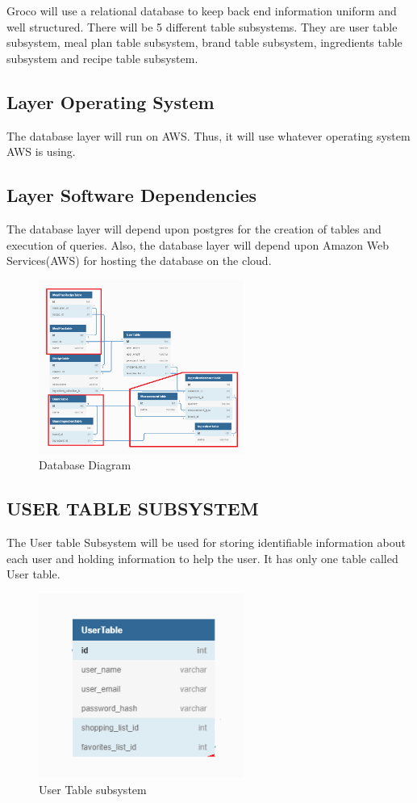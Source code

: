 Groco will  use a relational database to keep back end information uniform and well structured. There will be 5 different table subsystems. They are user table subsystem, meal plan table subsystem, brand table subsystem, ingredients table subsystem and recipe table subsystem.

\subsection{Layer Operating System}
The database layer will run on AWS. Thus, it will use whatever operating system AWS is using.

\subsection{Layer Software Dependencies}
The database layer will depend upon postgres for the creation of tables and execution of queries. Also, the database layer will depend upon Amazon Web Services(AWS) for hosting the database on the cloud. 

\begin{figure}[h!]
	\centering
 	\includegraphics[width=0.60\textwidth]{images/Database.png}
 \caption{Database Diagram}
\end{figure}

\subsection{USER TABLE SUBSYSTEM }
The User table Subsystem will be used for storing identifiable information about each user and holding information to help the user. It has only one table called User table.

\begin{figure}[h!]
	\centering
 	\includegraphics[width=0.60\textwidth]{images/User_Table.png}
 \caption{User Table subsystem }
\end{figure}

